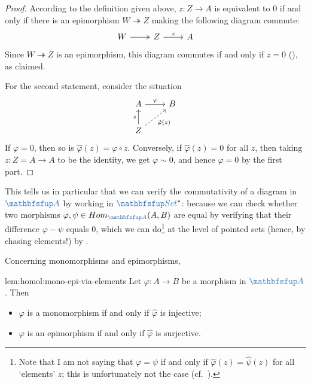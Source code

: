 \begin{proof}
  According to the definition given above, $z : Z \to A$ is equivalent
  to $0$ if and only if there is an epimorphism
  $W \twoheadrightarrow Z$ making the following diagram commute:
  \[\begin{tikzcd}
      W \arrow[r, two heads] & Z \arrow[r, "z"] & A
    \end{tikzcd}\] Since $W \twoheadrightarrow Z$ is an epimorphism,
  this diagram commutes if and only if $z = 0$
  (), as claimed.

  For the second statement, consider the situation
  \[\begin{tikzcd}
      A \arrow[r, "\varphi"] & B \\
      Z \arrow[u, "z"] \arrow[ur, dashed, "\hat{\varphi}(z)"'] &
    \end{tikzcd}\] If $\varphi = 0$, then so is
  $\hat{\varphi}(z) = \varphi \circ z$.  Conversely, if
  $\hat{\varphi}(z) = 0$ for all $z$, then taking $z : Z = A \to A$ to
  be the identity, we get $\varphi \sim 0$, and hence $\varphi = 0$ by
  the first part.
\end{proof}
This tells us in particular that we can verify the commutativity of a
diagram in $\categ{A}$ by working in $\categ{Set}^*$: because we can
check whether two morphisms $\varphi, \psi \in \Hom_{\categ{A}}(A,B)$
are equal by verifying that their difference $\varphi - \psi$ equals
$0$, which we can do\footnote{Note that I am not saying that
  $\varphi = \psi$ if and only if $\hat{\varphi}(z) = \hat{\psi}(z)$
  for all `elements' $z$; this is unfortunately not the case (cf.\
  ).} at the level of
pointed sets (hence, by chasing elements!) by .

Concerning monomorphisms and epimorphisms,

\begin{lem}{}{lem:homol:mono-epi-via-elements}
  Let $\varphi : A \to B$ be a morphism in $\categ{A}$. Then
  \begin{itemize}
  \item $\varphi$ is a monomorphism if and only if $\hat{\varphi}$ is
    injective;
  \item $\varphi$ is an epimorphism if and only if $\hat{\varphi}$ is
    surjective.
  \end{itemize}
\end{lem}

